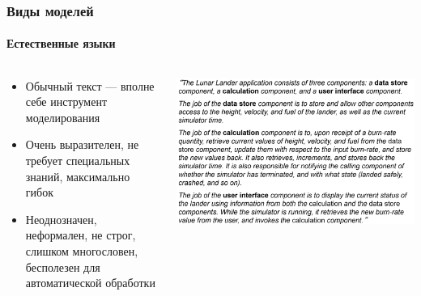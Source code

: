 \documentclass{../mcsslides}
\begin{document}
    \begin{frame}
        \frametitle{Виды моделей}
        \framesubtitle{Естественные языки}
        \begin{columns}
            \begin{column}{0.5\textwidth}
                \begin{itemize}
                    \item Обычный текст --- вполне себе инструмент моделирования
                    \item Очень выразителен, не требует специальных знаний, максимально гибок
                    \item Неоднозначен, неформален, не строг, слишком многословен, бесполезен для автоматической обработки
                \end{itemize}
            \end{column}
            \begin{column}{0.5\textwidth}
                \begin{center}
                    \includegraphics[width=\textwidth]{naturalLanguage.png}
                \end{center}
            \end{column}
        \end{columns}
    \end{frame}
\end{document}
